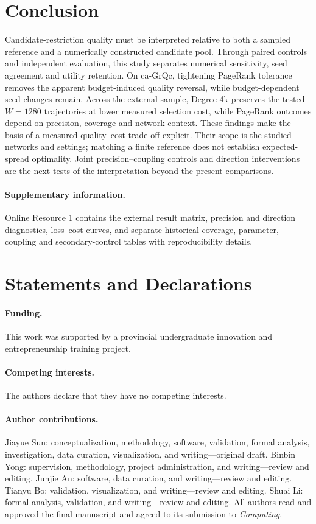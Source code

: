 \documentclass[smallextended]{svjour3}
\begin{document}
\section{Conclusion}
Candidate-restriction quality must be interpreted relative to both a sampled reference and a numerically constructed candidate pool. Through paired controls and independent evaluation, this study separates numerical sensitivity, seed agreement and utility retention. On ca-GrQc, tightening PageRank tolerance removes the apparent budget-induced quality reversal, while budget-dependent seed changes remain. Across the external sample, Degree-4k preserves the tested $W=1280$ trajectories at lower measured selection cost, while PageRank outcomes depend on precision, coverage and network context. These findings make the basis of a measured quality--cost trade-off explicit. Their scope is the studied networks and settings; matching a finite reference does not establish expected-spread optimality. Joint precision--coupling controls and direction interventions are the next tests of the interpretation beyond the present comparisons.

\paragraph{Supplementary information.} Online Resource 1 contains the external result matrix, precision and direction diagnostics, loss--cost curves, and separate historical coverage, parameter, coupling and secondary-control tables with reproducibility details.
\section*{Statements and Declarations}
\paragraph{Funding.} This work was supported by a provincial undergraduate innovation and entrepreneurship training project.
\paragraph{Competing interests.} The authors declare that they have no competing interests.
\paragraph{Author contributions.} Jiayue Sun: conceptualization, methodology, software, validation, formal analysis, investigation, data curation, visualization, and writing---original draft. Binbin Yong: supervision, methodology, project administration, and writing---review and editing. Junjie An: software, data curation, and writing---review and editing. Tianyu Bo: validation, visualization, and writing---review and editing. Shuai Li: formal analysis, validation, and writing---review and editing. All authors read and approved the final manuscript and agreed to its submission to \textit{Computing}.
\end{document}
